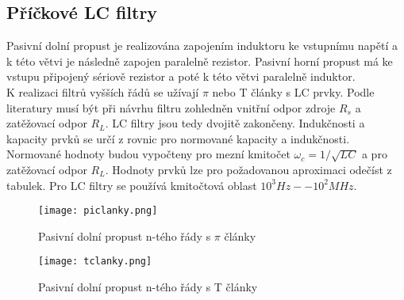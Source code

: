 \subsection{Příčkové LC filtry}\label{s:LC}
Pasivní dolní propust je realizována zapojením induktoru ke vstupnímu napětí a k této větvi je následně zapojen paralelně rezistor. Pasivní horní propust má ke vstupu připojený sériově rezistor a poté k této větvi paralelně induktor. \\
K realizaci filtrů vyšších řádů se užívají $\pi$ nebo T články s LC prvky. Podle literatury \cite{18} musí být při návrhu filtru zohledněn vnitřní odpor zdroje $R_s$ a zatěžovací odpor $R_L$. LC filtry jsou tedy dvojitě zakončeny. Indukčnosti a kapacity prvků se určí z rovnic pro normované kapacity a indukčnosti. Normované hodnoty budou vypočteny pro mezní kmitočet $\omega _c = 1/\sqrt{LC}$ a pro zatěžovací odpor $R_L$. Hodnoty prvků lze pro požadovanou aproximaci odečíst z tabulek. Pro LC filtry se používá kmitočtová oblast $10^{3} Hz -- 10^{2} MHz$.\\
\begin{figure}[h]
\centering
\texttt{[image: piclanky.png]}
\caption[Pasivní dolní propust n-tého řády s $\pi$ články]{Pasivní dolní propust n-tého řády s $\pi$ články \cite{18}}
\end{figure}
\begin{figure}[h]
\centering
\texttt{[image: tclanky.png]}
\caption[Pasivní dolní propust n-tého řády s T články]{Pasivní dolní propust n-tého řády s T články \cite{18}}
\end{figure}
